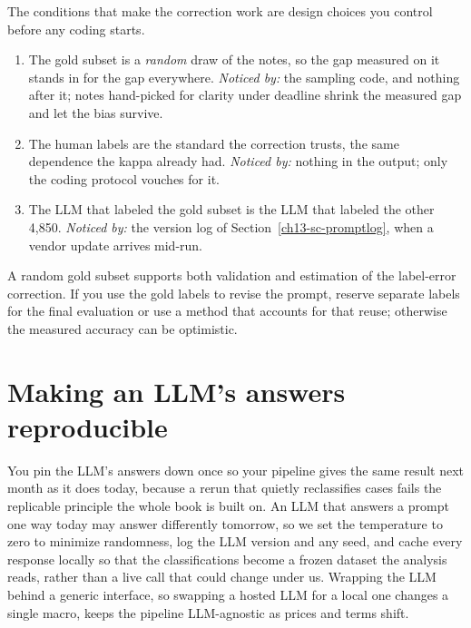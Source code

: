 \documentclass[
    a4paper,
    fontsize=10pt,
    twoside=true,
    numbers=noenddot,
]{kaobook}
\newenvironment{restson}[1][What this depends on]{%
    \begin{restsonbox}[frametitle={#1}]%
}{%
    \end{restsonbox}%
}
\begin{document}
The conditions that make the correction work are design choices you control before any coding starts.

\begin{restson}[What the corrected estimate depends on]
\begin{enumerate}
\item The gold subset is a \emph{random} draw of the notes, so the gap measured on it stands in for the gap everywhere. \emph{Noticed by:} the sampling code, and nothing after it; notes hand-picked for clarity under deadline shrink the measured gap and let the bias survive.
\item The human labels are the standard the correction trusts, the same dependence the kappa already had. \emph{Noticed by:} nothing in the output; only the coding protocol vouches for it.
\item The LLM that labeled the gold subset is the LLM that labeled the other 4,850. \emph{Noticed by:} the version log of Section~\ref{ch13-sc-promptlog}, when a vendor update arrives mid-run.
\end{enumerate}
\end{restson}

A random gold subset supports both validation and estimation of the label-error correction. If you use the gold labels to revise the prompt, reserve separate labels for the final evaluation or use a method that accounts for that reuse; otherwise the measured accuracy can be optimistic.

\section{Making an LLM's answers reproducible}
You pin the LLM's answers down once so your pipeline gives the same result next month as it does today, because a rerun that quietly reclassifies cases fails the replicable principle the whole book is built on. An LLM that answers a prompt one way today may answer differently tomorrow, so we set the temperature to zero to minimize randomness, log the LLM version and any seed, and cache every response locally so that the classifications become a frozen dataset the analysis reads, rather than a live call that could change under us. Wrapping the LLM behind a generic interface, so swapping a hosted LLM for a local one changes a single macro, keeps the pipeline LLM-agnostic as prices and terms shift.
\end{document}

